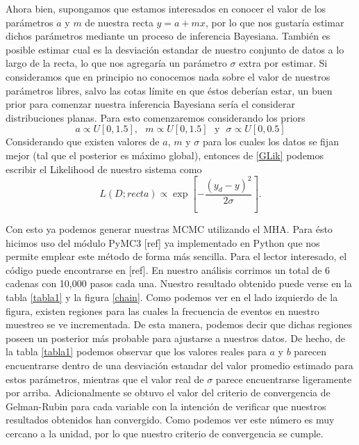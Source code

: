 \documentclass[onecolumn,           %
               showpacs,            %
               preprintnumbers,     %
               aps,                 %
               prl,          	    %
               letterpaper,             %
               superscriptaddress,      %
               nofootinbib,         %
               tightenlines,        %
               floats,floatfix      %
               ,usenatbib,
               ]{revtex4-1}
\begin{document}
Ahora bien, supongamos que estamos interesados en conocer el valor de los par\'ametros $a$ y $m$ de nuestra recta $y=a+mx$, por lo que nos gustar\'ia estimar dichos par\'ametros mediante un proceso de inferencia Bayesiana. Tambi\'en es posible estimar cual es la desviaci\'on estandar de nuestro conjunto de datos a lo largo de la recta, lo que nos agregar\'ia un par\'ametro $\sigma$ extra por estimar. Si consideramos que en principio no conocemos nada sobre el valor de nuestros par\'ametros libres, salvo las cotas l\'imite en que \'estos deber\'ian estar, un buen prior para comenzar nuestra inferencia Bayesiana ser\'ia el considerar distribuciones planas. Para esto comenzaremos considerando los priors
\begin{equation}
a \propto U[0,1.5], \ \ \ m \propto U[0,1.5]  \ \ \ \text{y} \ \ \ \sigma \propto U[0,0.5]
\end{equation}
Considerando que existen valores de $a$, $m$ y $\sigma$ para los cuales los datos se fijan mejor (tal que el posterior es m\'aximo global), entonces de \eqref{GLik} podemos escribir el Likelihood de nuestro sistema como 
\begin{equation}
L(D;recta)\propto \exp\left[-\frac{(y_d-y)^2}{2\sigma}\right].
\end{equation}

Con esto ya podemos generar nuestras MCMC utilizando el MHA. Para \'esto hicimos uso del m\'odulo PyMC3 [ref] ya implementado en Python que nos permite emplear este m\'etodo de forma m\'as sencilla. Para el lector interesado, el c\'odigo puede encontrarse en [ref]. En nuestro an\'alisis corrimos un total de 6 cadenas con 10,000 pasos cada una. Nuestro resultado obtenido puede verse en la tabla \ref{tabla1} y la figura \ref{chain}. Como podemos ver en el lado izquierdo de la figura, existen regiones para las cuales la frecuencia de eventos en nuestro muestreo se ve incrementada. De esta manera, podemos decir que dichas regiones poseen un posterior m\'as probable para ajustarse a nuestros datos. De hecho, de la tabla \ref{tabla1} podemos observar que los valores reales para $a$ y $b$ parecen encuentrarse dentro de una desviaci\'on estandar del valor promedio estimado para estos par\'ametros, mientras que el valor real de $\sigma$ parece encuentrarse ligeramente por arriba. Adicionalmente se obtuvo el valor del criterio de convergencia de Gelman-Rubin  para cada variable con la intenci\'on de verificar que nuestros resultados obtenidos han convergido. Como podemos ver este n\'umero es muy cercano a la unidad, por lo que nuestro criterio de convergencia se cumple.
\end{document}
